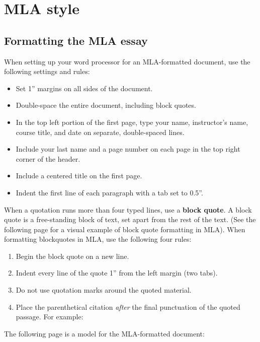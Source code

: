 
\chapter{MLA style} %


\section{Formatting the MLA essay}
When setting up your word processor for an MLA-formatted document, use the following settings and rules:

\begin{itemize}
\item Set 1'' margins on all sides of the document.
\item Double-space the entire document, including block quotes.
\item In the top left portion of the first page, type your name, instructor's name, course title, and date on separate, double-spaced lines.
\item Include your last name and a page number on each page in the top right corner of the header.
\item Include a centered title on the first page.
\item Indent the first line of each paragraph with a tab set to 0.5''.
\end{itemize}

When a quotation runs more than four typed lines, use a \textbf{block quote}. A block quote is a free-standing block of text, set apart from the rest of the text. (See the following page for a visual example of block quote formatting in MLA). When formatting blockquotes in MLA, use the following four rules: 

\begin{enumerate}
\item Begin the block quote on a new line. 
\item Indent every line of the quote 1'' from the left margin (two tabs). 
\item Do not use quotation marks around the quoted material. 
\item Place the parenthetical citation \emph{after} the final punctuation of the quoted passage. For example:
\end{enumerate}

The following page is a model for the MLA-formatted document:

